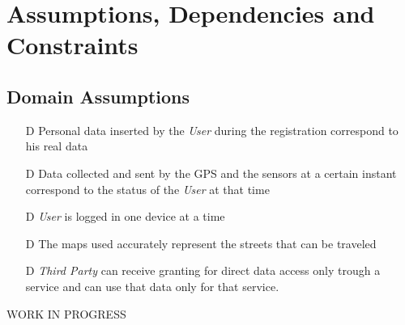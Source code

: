 \documentclass[../../rasd.tex]{subfiles}
\begin{document}
\section{Assumptions, Dependencies and Constraints}
		\subsection{Domain Assumptions}
			 	\begin{itemize}
				 	\item[D\subs{1}]Personal data inserted by the \textit{User} during the registration correspond to his real data
					\item[D\subs{2}]Data collected and sent by the GPS and the sensors at a certain instant correspond to the status of the \textit{User} at that time
				
					\item[D\subs{3}]\textit{User} is logged in one device at a time

					\item[D\subs{4}]The maps used accurately represent the streets that can be traveled
					\item[D\subs{5}]\textit{Third Party} can receive granting for direct data access only trough a service and can use that data only for that service.
				
				\end{itemize}
		WORK IN PROGRESS
		
\end{document}

